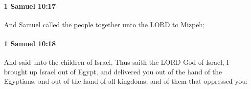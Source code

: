 		\paragraph{1 Samuel 10:17} %
			\label{1SAMUEL-10-17}

			And Samuel called the people together unto the LORD to Mizpeh;


		\paragraph{1 Samuel 10:18} %
			\label{1SAMUEL-10-18}

			And said unto the children of Israel, Thus saith the LORD God of Israel, I brought up Israel out of Egypt, and delivered you out of the hand of the Egyptians, and out of the hand of all kingdoms, and of them that oppressed you:


